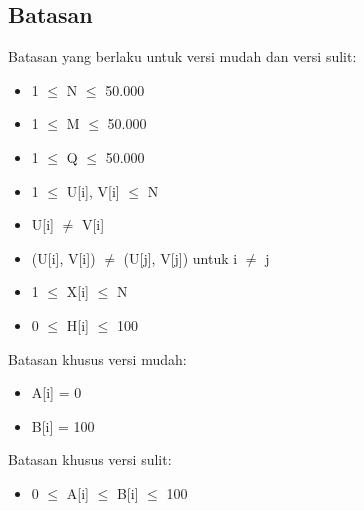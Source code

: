 \documentclass[../main_problemset.tex]{subfiles} %
\begin{document}
\subsection*{Batasan}

\begin{minipage}[t]{0.47\textwidth}

Batasan yang berlaku untuk versi mudah dan versi sulit:

\begin{itemize}
	\item 1 $ \leq $ N $ \leq $ 50.000
	\item 1 $ \leq $ M $ \leq $ 50.000
	\item 1 $ \leq $ Q $ \leq $ 50.000
	\item 1 $ \le $ U[i], V[i] $ \le $ N
	\item U[i] $ \neq $ V[i]
	\item (U[i], V[i]) $ \neq $ (U[j], V[j]) untuk i $ \neq $ j
	\item 1 $ \leq $ X[i] $ \leq $ N
	\item 0 $ \leq $ H[i] $ \leq $ 100
\end{itemize}
\end{minipage}
\begin{minipage}[t]{0.06\textwidth}
	\hfill
\end{minipage}
\begin{minipage}[t]{0.47\textwidth}
Batasan khusus versi mudah:
\begin{itemize}
	\item A[i] = 0
	\item B[i] = 100
\end{itemize}

\vspace{.2cm}

Batasan khusus versi sulit:
\begin{itemize}
	\item 0 $ \le $ A[i] $ \le $ B[i] $ \le $ 100
\end{itemize}
\end{minipage}
\end{document}
